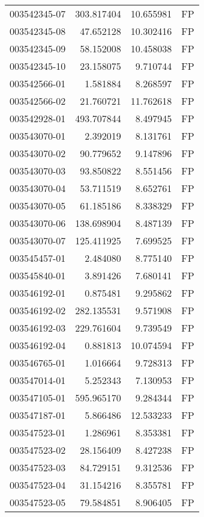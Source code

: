 \begin{tabular}{lrrl}
003542345-07 &  303.817404 &    10.655981 &   FP \\
003542345-08 &   47.652128 &    10.302416 &   FP \\
003542345-09 &   58.152008 &    10.458038 &   FP \\
003542345-10 &   23.158075 &     9.710744 &   FP \\
003542566-01 &    1.581884 &     8.268597 &   FP \\
003542566-02 &   21.760721 &    11.762618 &   FP \\
003542928-01 &  493.707844 &     8.497945 &   FP \\
003543070-01 &    2.392019 &     8.131761 &   FP \\
003543070-02 &   90.779652 &     9.147896 &   FP \\
003543070-03 &   93.850822 &     8.551456 &   FP \\
003543070-04 &   53.711519 &     8.652761 &   FP \\
003543070-05 &   61.185186 &     8.338329 &   FP \\
003543070-06 &  138.698904 &     8.487139 &   FP \\
003543070-07 &  125.411925 &     7.699525 &   FP \\
003545457-01 &    2.484080 &     8.775140 &   FP \\
003545840-01 &    3.891426 &     7.680141 &   FP \\
003546192-01 &    0.875481 &     9.295862 &   FP \\
003546192-02 &  282.135531 &     9.571908 &   FP \\
003546192-03 &  229.761604 &     9.739549 &   FP \\
003546192-04 &    0.881813 &    10.074594 &   FP \\
003546765-01 &    1.016664 &     9.728313 &   FP \\
003547014-01 &    5.252343 &     7.130953 &   FP \\
003547105-01 &  595.965170 &     9.284344 &   FP \\
003547187-01 &    5.866486 &    12.533233 &   FP \\
003547523-01 &    1.286961 &     8.353381 &   FP \\
003547523-02 &   28.156409 &     8.427238 &   FP \\
003547523-03 &   84.729151 &     9.312536 &   FP \\
003547523-04 &   31.154216 &     8.355781 &   FP \\
003547523-05 &   79.584851 &     8.906405 &   FP \\

\end{tabular}
